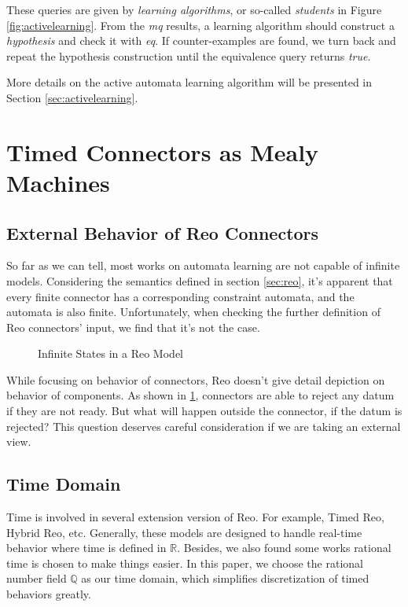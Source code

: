 \documentclass[conference, a4paper]{IEEEtran}
\begin{document}
These queries are given by \emph{learning algorithms}, or so-called \emph{students} in Figure
\ref{fig:activelearning}. From the \emph{mq} results, a learning algorithm should construct a
\emph{hypothesis} and check it with \emph{eq}. If counter-examples are found, we turn back and
repeat the hypothesis construction until the equivalence query returns \emph{true}.

More details on the active automata learning algorithm will be presented in Section
\ref{sec:activelearning}. 

\section{Timed Connectors as Mealy Machines}

\subsection{External Behavior of Reo Connectors}
So far as we can tell, most
works\cite{DBLP:conf/fase/RaffeltS06, DBLP:journals/corr/ChenHLLTWW15} on automata learning are not
capable of infinite models.  Considering the semantics defined in section
\ref{sec:reo}, it's apparent that every finite connector has a corresponding constraint
automata, and the automata is also finite. Unfortunately, when checking the further definition of
Reo connectors' input, we find that it's not the case.


\begin{figure}[h]
  \caption{Infinite States in a Reo Model}
  \label{fig:reoinfinite}
\end{figure}

While focusing on behavior of connectors, Reo doesn't give detail depiction on behavior of
components. As shown in \figurename \ref{fig:reoinfinite}, connectors are able to reject any datum
if they are not ready. But what will happen outside the connector, if the datum is rejected? This
question deserves careful consideration if we are taking an external view.

\subsection{Time Domain}
Time is involved in several extension version of Reo. For example, Timed
Reo\cite{DBLP:conf/sefm/ArbabBBR04}, Hybrid Reo\cite{DBLP:conf/icfem/ChenSS14}, etc.
Generally, these models are designed to handle real-time behavior where time is defined in
$\mathbb{R}$. Besides, we also found some works\cite{DBLP:journals/fmsd/PrabhakarDM015} rational
time is chosen to make things easier. In this paper, we choose the rational number field
$\mathbb{Q}$ as our time domain, which simplifies discretization of timed behaviors greatly.
\end{document}
